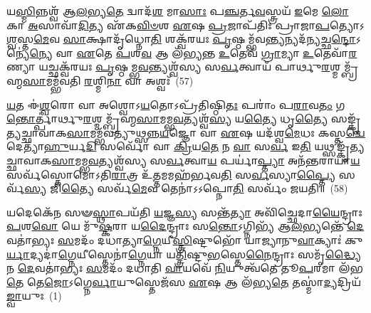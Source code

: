 𑌯\-\ul{𑌸𑍍𑌮𑌿}\-𑌨𑍍𑌨𑌶𑍍𑌵᳴ 𑌆\-\ul{𑌲}\-𑌭𑍍𑌯\-\ul{𑌤𑍇} 𑌦𑍍𑌵𑌾𑌦᳴\-\ul{𑌶} 𑌮𑌾\-\ul{𑌸𑌾𑌃} 𑌪\-\ul{𑌞𑍍𑌚}\-𑌰𑍍𑌤\-\ul{𑌵}\-𑌸𑍍𑌤𑍍𑌰𑌯᳴ \ul{𑌇}\-𑌮𑍇 \ul{𑌲𑍋}\-𑌕𑌾 \ul{𑌅}\-𑌸𑌾𑌵𑌾᳴\-\ul{𑌦𑌿}\-𑌤𑍍𑌯 𑌏᳴𑌕\-\ul{𑌵𑌿}\-\-\ul{𑍞}\-𑌶 \ul{𑌏}\-𑌷 \ul{𑌪𑍍𑌰}\-𑌜𑌾𑌪᳴𑌤𑌿𑌃 𑌪𑍍𑌰𑌾𑌜𑌾\-\ul{𑌪}\-𑌤𑍍𑌯𑍋\-𑌽\-\ul{𑌶𑍍𑌵}\-𑌸𑍍𑌤\-\ul{𑌮𑍇}\-𑌵 \ul{𑌸𑌾}\-𑌕𑍍𑌷𑌾𑌦𑍃᳴𑌧𑍍𑌨𑍋\-\ul{𑌤𑌿} 𑌶𑌕𑍍𑌵᳴𑌰𑌯𑌃 \ul{𑌪𑍃}\-𑌷𑍍𑌠𑌮𑍍𑌭᳴𑌵\-\ul{𑌨𑍍𑌤𑍍𑌯}\-𑌨𑍍𑌯𑌦᳴\-\ul{𑌨𑍍𑌯}\-𑌚𑍍𑌛\-\ul{𑌨𑍍𑌦𑍋}\-\-𑌽𑌨𑍍𑌯𑍇॑\-\ul{𑌨𑍍𑌯𑍇} 𑌵𑌾 \ul{𑌏}\-𑌤𑍇 \ul{𑌪}\-𑌶\-\ul{𑌵} 𑌆 𑌲᳴𑌭𑍍𑌯𑌨𑍍𑌤 \ul{𑌉}\-𑌤𑍇𑌵᳴ \ul{𑌗𑍍𑌰𑌾}\-𑌮𑍍𑌯𑌾 \ul{𑌉}\-𑌤𑍇𑌵𑌾᳴\-\ul{𑌰}\-𑌣𑍍𑌯𑌾 𑌯𑌚𑍍𑌛𑌕𑍍𑌵᳴𑌰𑌯𑌃 \ul{𑌪𑍃}\-𑌷𑍍𑌠𑌮𑍍𑌭\-\ul{𑌵}\-𑌨𑍍𑌤𑍍𑌯𑌶𑍍𑌵᳴𑌸𑍍𑌯 𑌸\-\ul{𑌰𑍍𑌵}\-𑌤𑍍𑌵𑌾𑌯᳴ 𑌪𑌾𑌰𑍍𑌥𑍁\-\ul{𑌰}\-𑌶𑍍𑌮𑌮𑍍𑌬𑍍𑌰᳴𑌹𑍍𑌮\-\ul{𑌸𑌾}\-𑌮𑌮𑍍𑌭᳴𑌵𑌤𑌿 \ul{𑌰}\-𑌶𑍍𑌮𑌿\-\ul{𑌨𑌾} 𑌵𑌾 𑌅𑌶𑍍𑌵𑌃᳴~(57)

\-\ul{𑌯}\-𑌤 𑌈॑\-\ul{𑌶𑍍𑌵}\-𑌰𑍋 𑌵𑌾 𑌅𑌶𑍍𑌵𑍋\-𑌽\-\ul{𑌯}\-𑌤𑍋\-𑌽𑌪𑍍𑌰᳴𑌤𑌿𑌷𑍍𑌠𑌿\-\ul{𑌤𑌃} 𑌪𑌰𑌾𑌂॑ 𑌪\-\ul{𑌰𑌾}\-𑌵\-\ul{𑌤𑌂} 𑌗\-\ul{𑌨𑍍𑌤𑍋}\-𑌰𑍍𑌤𑍍𑌪𑌾॑𑌰𑍍𑌥𑍁\-\ul{𑌰}\-𑌶𑍍𑌮𑌮𑍍𑌬𑍍𑌰᳴𑌹𑍍𑌮\-\ul{𑌸𑌾}\-𑌮𑌮𑍍𑌭\-\ul{𑌵}\-𑌤𑍍𑌯𑌶𑍍𑌵᳴\-\ul{𑌸𑍍𑌯} 𑌯\-\ul{𑌤𑍍𑌯𑍈} 𑌧𑍃\-\ul{𑌤𑍍𑌯𑍈} 𑌸𑌙𑍍𑌕𑍃᳴𑌤𑍍𑌯𑌚𑍍𑌛𑌾𑌵𑌾𑌕\-\ul{𑌸𑌾}\-𑌮𑌮𑍍𑌭᳴𑌵𑌤𑍍𑌯𑍁𑌥𑍍𑌸𑌨𑍍𑌨\-\ul{𑌯}\-𑌜𑍍𑌞𑍋 𑌵𑌾 \ul{𑌏}\-𑌷 𑌯𑌦᳴𑌶𑍍𑌵\-\ul{𑌮𑍇}\-𑌧𑌃 𑌕𑌸𑍍𑌤\-\ul{𑌦𑍍𑌵𑍇}\-𑌦𑍇𑌤𑍍𑌯𑌾᳴\-\ul{𑌹𑍁}\-𑌰𑍍𑌯\-\ul{𑌦𑌿} 𑌸𑌰𑍍𑌵𑍋᳴ 𑌵𑌾 \ul{𑌕𑍍𑌰𑌿}\-𑌯\-\ul{𑌤𑍇} 𑌨 \ul{𑌵𑌾} 𑌸\-\ul{𑌰𑍍𑌵} 𑌇\-\ul{𑌤𑌿} 𑌯𑌥𑍍𑌸𑌙𑍍𑌕𑍃᳴𑌤𑍍𑌯𑌚𑍍𑌛𑌾𑌵𑌾𑌕\-\ul{𑌸𑌾}\-𑌮𑌮𑍍𑌭\-\ul{𑌵}\-𑌤𑍍𑌯𑌶𑍍𑌵᳴𑌸𑍍𑌯 𑌸\-\ul{𑌰𑍍𑌵}\-𑌤𑍍𑌵𑌾\-\ul{𑌯} 𑌪𑌰𑍍𑌯𑌾॑\-\ul{𑌪𑍍𑌤𑍍𑌯𑌾} 𑌅𑌨᳴𑌨𑍍𑌤𑌰𑌾𑌯𑌾\-\ul{𑌯} 𑌸𑌰𑍍𑌵᳴𑌸𑍍𑌤𑍋𑌮𑍋\-𑌽𑌤𑌿\-\ul{𑌰𑌾}\-𑌤𑍍𑌰 𑌉᳴\-\ul{𑌤𑍍𑌤}\-𑌮𑌮𑌹᳴𑌰𑍍𑌭𑌵\-\ul{𑌤𑌿} 𑌸\-\ul{𑌰𑍍𑌵}\-𑌸𑍍𑌯𑌾\-\ul{𑌪𑍍𑌤𑍍𑌯𑍈} 𑌸𑌰𑍍𑌵᳴\-\ul{𑌸𑍍𑌯} 𑌜𑌿\-\ul{𑌤𑍍𑌯𑍈} 𑌸𑌰𑍍𑌵᳴\-\ul{𑌮𑍇}\-𑌵 𑌤𑍇𑌨𑌾॑𑌽𑌽𑌪𑍍𑌨𑍋\-\ul{𑌤𑌿} 𑌸𑌰𑍍𑌵𑌂᳴ 𑌜𑌯𑌤𑌿॥~(58)

{\anuvakamend[{𑌅𑌹᳴𑌰𑍍𑌭𑌵\-\ul{𑌤𑌿} 𑌵𑌾 𑌅𑌶𑍍𑌵𑍋\-𑌽𑌹᳴𑌰𑍍𑌭𑌵\-\ul{𑌤𑌿} 𑌦𑌶᳴ 𑌚}]}%


{}%

\setcounter{anuvakam}{0}
𑌯𑌦𑍇𑌕𑍇᳴𑌨 𑌸𑍟\-\ul{𑌸𑍍𑌥𑌾}\-𑌪𑌯᳴𑌤𑌿 \ul{𑌯}\-𑌜𑍍𑌞\-\ul{𑌸𑍍𑌯} 𑌸𑌨𑍍𑌤᳴\-\ul{𑌤𑍍𑌯𑌾} 𑌅𑌵𑌿᳴𑌚𑍍𑌛𑍇𑌦𑌾\-\ul{𑌯𑍈}\-𑌨𑍍𑌦𑍍𑌰𑌾𑌃 \ul{𑌪}\-𑌶\-\ul{𑌵𑍋} 𑌯𑍇 𑌮𑍁᳴\-\ul{𑌷𑍍𑌕}\-𑌰𑌾 𑌯\-\ul{𑌦𑍈}\-𑌨𑍍𑌦𑍍𑌰𑌾𑌃 𑌸\-\ul{𑌨𑍍𑌤𑍋}\-\-𑌽𑌗𑍍𑌨𑌿𑌭𑍍𑌯᳴ 𑌆\-\ul{𑌲}\-𑌭𑍍𑌯𑌨𑍍𑌤𑍇᳴ \ul{𑌦𑍇}\-𑌵𑌤𑌾॑𑌭𑍍𑌯𑌃 \ul{𑌸}\-𑌮𑌦𑌂᳴ 𑌦𑌧𑌾𑌤𑍍𑌯𑌾\-\ul{𑌗𑍍𑌨𑍇}\-𑌯𑍀\-\ul{𑌸𑍍𑌤𑍍𑌰𑌿}\-𑌷𑍍𑌟𑍁𑌭𑍋᳴ 𑌯𑌾𑌜𑍍𑌯𑌾𑌨𑍁\-\ul{𑌵𑌾}\-𑌕𑍍𑌯𑌾𑌃॑ 𑌕𑍁\-\ul{𑌰𑍍𑌯𑌾}\-𑌦𑍍𑌯𑌦𑌾॑\-\ul{𑌗𑍍𑌨𑍇}\-𑌯𑍀𑌸𑍍𑌤𑍇𑌨𑌾॑\-\ul{𑌗𑍍𑌨𑍇}\-𑌯𑌾 𑌯\-\ul{𑌤𑍍𑌤𑍍𑌰𑌿}\-𑌷𑍍𑌟𑍁\-\ul{𑌭}\-𑌸𑍍𑌤𑍇\-\ul{𑌨𑍈}\-𑌨𑍍𑌦𑍍𑌰𑌾𑌃 𑌸𑌮𑍃᳴\-\ul{𑌦𑍍𑌧𑍍𑌯𑍈} 𑌨 \ul{𑌦𑍇}\-𑌵𑌤𑌾॑𑌭𑍍𑌯𑌃 \ul{𑌸}\-𑌮𑌦𑌂᳴ 𑌦𑌧𑌾𑌤𑌿 \ul{𑌵𑌾}\-𑌯𑌵𑍇᳴ \ul{𑌨𑌿}\-𑌯𑍁𑌤𑍍𑌵᳴𑌤𑍇 𑌤𑍂\-\ul{𑌪}\-𑌰𑌮𑌾 𑌲᳴𑌭\-\ul{𑌤𑍇} 𑌤𑍇\-\ul{𑌜𑍋}\-\-𑌽𑌗𑍍𑌨𑍇\-\ul{𑌰𑍍𑌵𑌾}\-𑌯𑍁𑌸𑍍𑌤𑍇𑌜᳴𑌸 \ul{𑌏}\-𑌷 𑌆 𑌲᳴𑌭𑍍𑌯\-\ul{𑌤𑍇} 𑌤𑌸𑍍𑌮𑌾॑\-\ul{𑌦𑍍𑌯}\-𑌦𑍍𑌰𑌿𑌯᳴\-\ul{𑌙𑍍𑌵𑌾}\-𑌯𑍁𑌃~(1)

